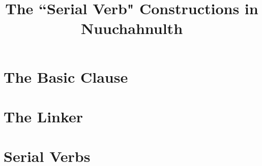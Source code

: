 \documentclass[12pt]{article}
\begin{document}

\avmsortfont{\it}
\avmfont{\sc}
\avmvalfont{\rm}

\setmainfont{Brill}
\title{The ``Serial Verb" Constructions in Nuuchahnulth}

\date{}


\tableofcontents

%

%

\section{The Basic Clause}


\section{The Linker}


\section{Serial Verbs}




\end{document}
